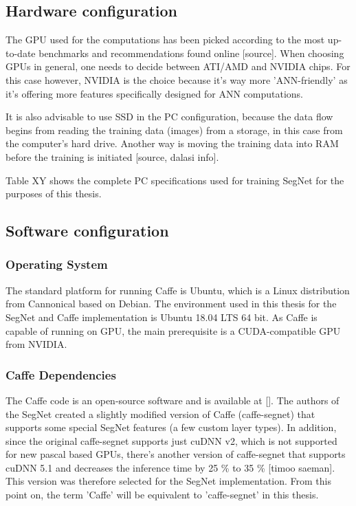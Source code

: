 \subsection{Hardware configuration}

The GPU used for the computations has been picked according to the most up-to-date benchmarks and recommendations found online [source]. When choosing GPUs in general, one needs to decide between ATI/AMD and NVIDIA chips. For this case however, NVIDIA is the choice because it's way more 'ANN-friendly' as it's offering more features specifically designed for ANN computations. 

It is also advisable to use SSD in the PC configuration, because the data flow begins from reading the training data (images) from a storage, in this case from the computer's hard drive. Another way is moving the training data into RAM before the training is initiated [source, dalasi info]. 

Table XY shows the complete PC specifications used for training SegNet for the purposes of this thesis.  

\subsection{Software configuration} 

\subsubsection{Operating System} 

The standard platform for running Caffe is Ubuntu, which is a Linux distribution from Cannonical based on Debian. The environment used in this thesis for the SegNet and Caffe implementation is Ubuntu 18.04 LTS 64 bit. As Caffe is capable of running on GPU, the main prerequisite is a CUDA-compatible GPU from NVIDIA. 

\subsubsection{Caffe Dependencies} 

The Caffe code is an open-source software and is available at []. The authors of the SegNet created a slightly modified version of Caffe (caffe-segnet) that supports some special SegNet features (a few custom layer types). In addition, since the original caffe-segnet supports just cuDNN v2, which is not supported for new pascal based GPUs, there's another version of caffe-segnet that supports cuDNN 5.1 and decreases the inference time by 25 \% to 35 \% [timoo saeman]. This version was therefore selected for the SegNet implementation. From this point on, the term 'Caffe' will be equivalent to 'caffe-segnet' in this thesis.

